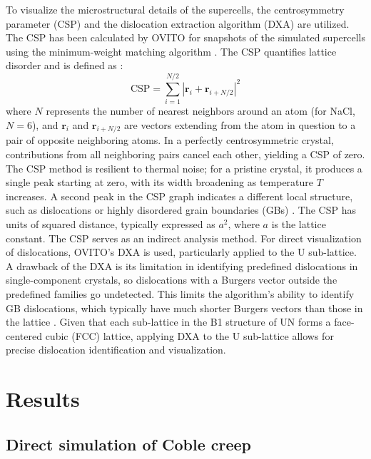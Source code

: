 \documentclass[preprint, 12pt]{elsarticle}
\newcommand{\?}{\stackrel{?}{=}}
\begin{document}
To visualize the microstructural details of the supercells, the centrosymmetry parameter (CSP) and the dislocation extraction algorithm (DXA) are utilized. The CSP has been calculated by OVITO for snapshots of the simulated supercells using the minimum-weight matching algorithm \cite{Larsen2020}. The CSP quantifies lattice disorder and is defined as \cite{Kelchner1998}:
\begin{equation}
\mathrm{CSP} = \sum_{i=1}^{N/2} |\mathbf{r}_i + \mathbf{r}_{i+N/2}|^{2}
\end{equation}
where $N$ represents the number of nearest neighbors around an atom (for NaCl, $N = 6$), and $\mathbf{r}_i$ and $\mathbf{r}_{i+N/2}$ are vectors extending from the atom in question to a pair of opposite neighboring atoms. In a perfectly centrosymmetric crystal, contributions from all neighboring pairs cancel each other, yielding a CSP of zero. The CSP method is resilient to thermal noise; for a pristine crystal, it produces a single peak starting at zero, with its width broadening as temperature $T$ increases. A second peak in the CSP graph indicates a different local structure, such as dislocations or highly disordered grain boundaries (GBs) \cite{Bulatov2006, Larsen2020}. The CSP has units of squared distance, typically expressed as $a^2$, where $a$ is the lattice constant. The CSP serves as an indirect analysis method. For direct visualization of dislocations, OVITO's DXA \cite{Stukowski2012} is used, particularly applied to the U sub-lattice. A drawback of the DXA is its limitation in identifying predefined dislocations in single-component crystals, so dislocations with a Burgers vector outside the predefined families go undetected. This limits the algorithm's ability to identify GB dislocations, which typically have much shorter Burgers vectors than those in the lattice \cite{Cai2016}. Given that each sub-lattice in the B1 structure of UN forms a face-centered cubic (FCC) lattice, applying DXA to the U sub-lattice allows for precise dislocation identification and visualization.

\section{Results}

\subsection{Direct simulation of Coble creep}
\label{Sec:CreepResults}
\end{document}
